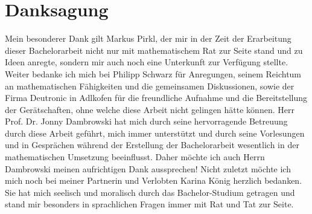 \chapter{Danksagung}
Mein besonderer Dank gilt Markus Pirkl, der mir in der Zeit der Erarbeitung dieser Bachelorarbeit nicht nur mit mathematischem Rat zur Seite stand und zu Ideen anregte, sondern mir auch noch eine Unterkunft zur Verfügung stellte. Weiter bedanke ich mich bei Philipp Schwarz für Anregungen, seinem Reichtum an mathematischen Fähigkeiten und die gemeinsamen Diskussionen, sowie der Firma Deutronic in Adlkofen für die freundliche Aufnahme und die Bereitstellung der Gerätschaften, ohne welche diese Arbeit nicht gelingen hätte können.
Herr Prof. Dr. Jonny Dambrowski hat mich durch seine hervorragende Betreuung durch diese Arbeit geführt, mich immer unterstützt und durch seine Vorlesungen und in Gesprächen während der Erstellung der Bachelorarbeit wesentlich in der mathematischen Umsetzung beeinflusst. Daher möchte ich auch Herrn Dambrowski meinen aufrichtigen Dank aussprechen!
Nicht zuletzt möchte ich mich noch bei meiner Partnerin und Verlobten Karina König herzlich bedanken. Sie hat mich seelisch und moralisch durch das Bachelor-Studium getragen und stand mir besonders in sprachlichen Fragen immer mit Rat und Tat zur Seite.
 